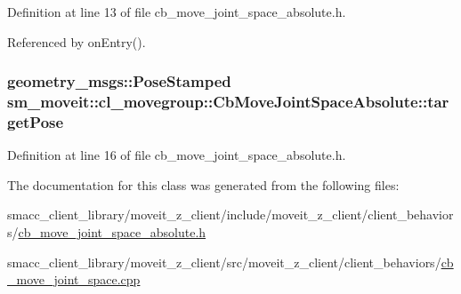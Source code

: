 Definition at line 13 of file cb\+\_\+move\+\_\+joint\+\_\+space\+\_\+absolute.\+h.



Referenced by on\+Entry().

\subsubsection[{\texorpdfstring{target\+Pose}{targetPose}}]{\setlength{\rightskip}{0pt plus 5cm}geometry\+\_\+msgs\+::\+Pose\+Stamped sm\+\_\+moveit\+::cl\+\_\+movegroup\+::\+Cb\+Move\+Joint\+Space\+Absolute\+::target\+Pose}\hypertarget{classsm__moveit_1_1cl__movegroup_1_1CbMoveJointSpaceAbsolute_a53f44681ff7043d4d059ded154a9fbb3}{}\label{classsm__moveit_1_1cl__movegroup_1_1CbMoveJointSpaceAbsolute_a53f44681ff7043d4d059ded154a9fbb3}


Definition at line 16 of file cb\+\_\+move\+\_\+joint\+\_\+space\+\_\+absolute.\+h.



The documentation for this class was generated from the following files\+:\begin{DoxyCompactItemize}
\item 
smacc\+\_\+client\+\_\+library/moveit\+\_\+z\+\_\+client/include/moveit\+\_\+z\+\_\+client/client\+\_\+behaviors/\hyperlink{cb__move__joint__space__absolute_8h}{cb\+\_\+move\+\_\+joint\+\_\+space\+\_\+absolute.\+h}\item 
smacc\+\_\+client\+\_\+library/moveit\+\_\+z\+\_\+client/src/moveit\+\_\+z\+\_\+client/client\+\_\+behaviors/\hyperlink{cb__move__joint__space_8cpp}{cb\+\_\+move\+\_\+joint\+\_\+space.\+cpp}\end{DoxyCompactItemize}

